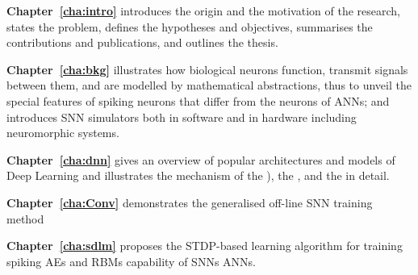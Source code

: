 \textbf{Chapter~\ref{cha:intro}} introduces the origin and the motivation of the research, states the problem, defines the hypotheses and objectives, summarises the contributions and publications, and outlines the thesis. 

\textbf{Chapter~\ref{cha:bkg}} %
illustrates how biological neurons function, transmit signals between them, and are modelled by mathematical abstractions, thus to unveil the special features of spiking neurons that differ from the neurons of ANNs; and introduces SNN simulators both in software and in hardware including neuromorphic systems.

\textbf{Chapter~\ref{cha:dnn}} gives an overview of popular architectures and models of Deep Learning and illustrates the mechanism of the \DIFdelbegin {}\DIFdelend \DIFaddbegin {}\DIFaddend ), the \DIFdelbegin {}\DIFdelend \DIFaddbegin {}\DIFaddend , and the \DIFdelbegin {}\DIFdelend \DIFaddbegin {}\DIFaddend in detail.

\textbf{Chapter~\ref{cha:Conv}} demonstrates the generalised off-line SNN training method \DIFdelbegin {}\DIFdelend \DIFaddbegin {}\DIFaddend 

\textbf{Chapter~\ref{cha:sdlm}} proposes the STDP-based learning algorithm for training spiking AEs and RBMs \DIFdelbegin {}\DIFdelend \DIFaddbegin {}\DIFaddend capability of SNNs \DIFdelbegin {}\DIFdelend \DIFaddbegin {}\DIFaddend ANNs.

